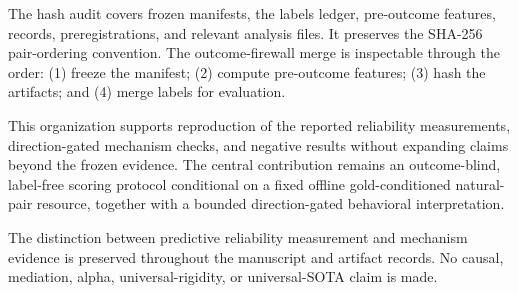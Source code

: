 \documentclass[11pt]{article}
\begin{document}
The hash audit covers frozen manifests, the labels ledger, pre-outcome features, records, preregistrations, and relevant analysis files. It preserves the SHA-256 pair-ordering convention. The outcome-firewall merge is inspectable through the order: (1) freeze the manifest; (2) compute pre-outcome features; (3) hash the artifacts; and (4) merge labels for evaluation.

This organization supports reproduction of the reported reliability measurements, direction-gated mechanism checks, and negative results without expanding claims beyond the frozen evidence. The central contribution remains an outcome-blind, label-free scoring protocol conditional on a fixed offline gold-conditioned natural-pair resource, together with a bounded direction-gated behavioral interpretation.

The distinction between predictive reliability measurement and mechanism evidence is preserved throughout the manuscript and artifact records. No causal, mediation, alpha, universal-rigidity, or universal-SOTA claim is made.


\end{document}

